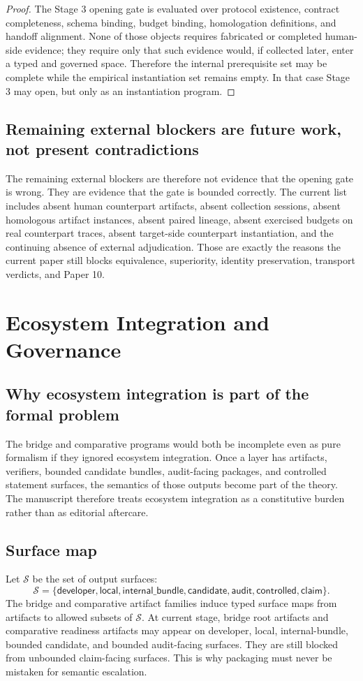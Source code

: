 \documentclass[11pt,a4paper]{article}
\theoremstyle{definition}
\begin{document}
\begin{proof}
The Stage 3 opening gate is evaluated over protocol existence, contract completeness, schema binding, budget binding, homologation definitions, and handoff alignment. None of those objects requires fabricated or completed human-side evidence; they require only that such evidence would, if collected later, enter a typed and governed space. Therefore the internal prerequisite set may be complete while the empirical instantiation set remains empty. In that case Stage 3 may open, but only as an instantiation program.
\end{proof}

\subsection{Remaining external blockers are future work, not present contradictions}
The remaining external blockers are therefore not evidence that the opening gate is wrong. They are evidence that the gate is bounded correctly. The current list includes absent human counterpart artifacts, absent collection sessions, absent homologous artifact instances, absent paired lineage, absent exercised budgets on real counterpart traces, absent target-side counterpart instantiation, and the continuing absence of external adjudication. Those are exactly the reasons the current paper still blocks equivalence, superiority, identity preservation, transport verdicts, and Paper 10.
\section{Ecosystem Integration and Governance}
\subsection{Why ecosystem integration is part of the formal problem}
The bridge and comparative programs would both be incomplete even as pure formalism if they ignored ecosystem integration. Once a layer has artifacts, verifiers, bounded candidate bundles, audit-facing packages, and controlled statement surfaces, the semantics of those outputs become part of the theory. The manuscript therefore treats ecosystem integration as a constitutive burden rather than as editorial aftercare.

\subsection{Surface map}
Let $\mathcal{S}$ be the set of output surfaces:
\[
\mathcal{S}=
\{
\mathsf{developer},
\mathsf{local},
\mathsf{internal\_bundle},
\mathsf{candidate},
\mathsf{audit},
\mathsf{controlled},
\mathsf{claim}
\}.
\]
The bridge and comparative artifact families induce typed surface maps from artifacts to allowed subsets of $\mathcal{S}$. At current stage, bridge root artifacts and comparative readiness artifacts may appear on developer, local, internal-bundle, bounded candidate, and bounded audit-facing surfaces. They are still blocked from unbounded claim-facing surfaces. This is why packaging must never be mistaken for semantic escalation.
\end{document}
